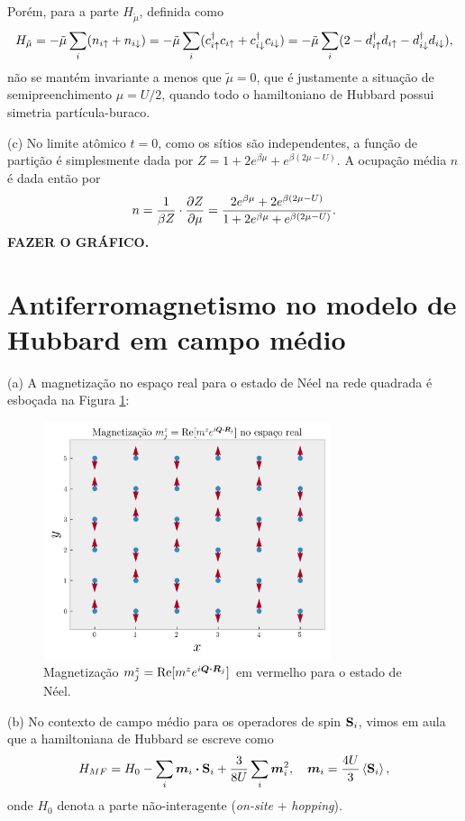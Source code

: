\documentclass[a4paper,10pt]{article}
\begin{document}
Porém, para a parte $H_{\tilde{\mu}}$, definida como
$$
H_{\tilde{\mu}} =
-\tilde{\mu} \sum_{i} (n_{i\up} + n_{i\down}) =
-\tilde{\mu} \sum_{i} (c_{i\up}^\d c_{i\up} + c_{i\down}^\d c_{i\down}) =
-\tilde{\mu} \sum_{i} (2 - d_{i\up}^\d d_{i\up} - d_{i\down}^\d d_{i\down}),
$$
não se mantém invariante a menos que $\tilde{\mu} = 0$, que é justamente a situação de semipreenchimento $\mu = U/2$, quando todo o hamiltoniano de Hubbard possui simetria partícula-buraco.

\n

(c) No limite atômico $t = 0$, como os sítios são independentes, a função de partição é simplesmente dada por $Z = 1 + 2 e^{\beta \mu} + e^{\beta(2\mu - U)}$. A ocupação média $n$ é dada então por
$$
n = \frac{1}{\beta Z} \cdot \pdv{Z}{\mu} =
\frac{2 e^{\beta\mu} + 2 e^{\beta(2\mu-U)}}{1 + 2 e^{\beta \mu} + e^{\beta(2\mu - U)}}.
$$
\textbf{FAZER O GRÁFICO.}




\pagebreak

\section{Antiferromagnetismo no modelo de Hubbard em campo médio}

(a) A magnetização no espaço real para o estado de Néel na rede quadrada é esboçada na Figura \ref{fig:mag-neel}:
\begin{figure}[H]
\centering
\includegraphics[width=0.75\textwidth]{fig/magnetization-real_space.png}
\caption{Magnetização $m^z_j = \Re[m^z e^{i \bm{Q} \vdot \bm{R}_j}]$ em vermelho para o estado de Néel.}
\label{fig:mag-neel}
\end{figure}

(b) No contexto de campo médio para os operadores de spin $\S_i$, vimos em aula que a hamiltoniana de Hubbard se escreve como
$$
H_{MF} = H_0 - \sum_{i} \bm{m}_i \vdot \S_i + \frac{3}{8U} \sum_{i} \bm{m}_i^2, \quad
\bm{m}_i = \frac{4U}{3} \ev{\S_i},
$$
onde $H_0$ denota a parte não-interagente (\textit{on-site} + \textit{hopping}).
\end{document}
